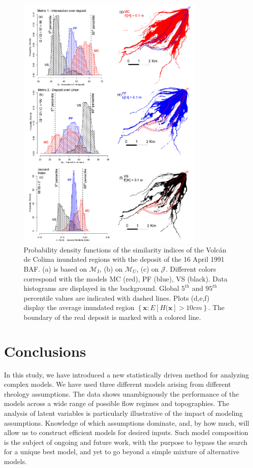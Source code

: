 \documentclass{article}
\begin{document}
\begin{figure}[H]
         \centering
        \includegraphics[width=0.82\textwidth]{Figures/Histograms.jpg}
        \caption{Probability density functions of the similarity indices of the Volc{\'a}n de Colima inundated regions with the deposit of the 16 April 1991 BAF. (a) is based on $\mathcal M_I$, (b) on $\mathcal M_U$, (c) on $\mathcal J$. Different colors correspond with the models MC (red), PF (blue), VS (black). Data histograms are displayed in the background. Global $5^{th}$ and $95^{th}$ percentile values are indicated with dashed lines. Plots (d,e,f) display the average inundated region $\left\{\textbf{x} : E[H(\textbf{x}]>10 cm\right\}$. The boundary of the real deposit is marked with a colored line.}\label{fig:Colima-Hist}
\end{figure}

\section{Conclusions}
In this study, we have introduced a new statistically driven method for analyzing complex models. We have used three different models arising from different rheology assumptions. The data shows unambiguously the performance of the models across a wide range of possible flow regimes and topographies. The analysis of latent variables is particularly illustrative of the impact of modeling assumptions. Knowledge of which assumptions dominate, and, by how much, will allow us to construct efficient models for desired inputs. Such model composition is the subject of ongoing and future work, with the purpose to bypass the search for a unique best model, and yet to go beyond a simple mixture of alternative models.
\end{document}
